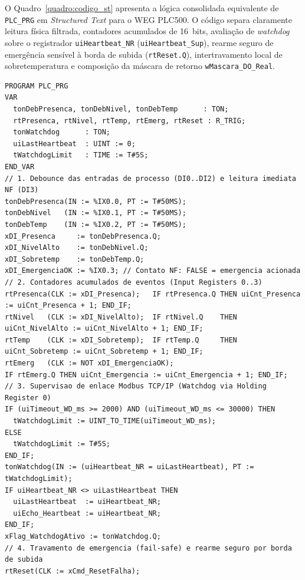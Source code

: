 O Quadro~\ref{quadro:codigo_st} apresenta a lógica consolidada equivalente de \texttt{PLC\_PRG} em \textit{Structured Text} para o WEG PLC500. O código separa claramente leitura física filtrada, contadores acumulados de 16~bits, avaliação de \textit{watchdog} sobre o registrador \texttt{uiHeartbeat\_NR} (\texttt{uiHeartbeat\_Sup}), rearme seguro de emergência sensível à borda de subida (\texttt{rtReset.Q}), intertravamento local de sobretemperatura e composição da máscara de retorno \texttt{wMascara\_DO\_Real}.

\begin{quadro}[htb]
  \centering
  \SingleSpacing
  \caption{Implementação em Structured Text (IEC 61131-3) do programa \texttt{PLC\_PRG} no WEG PLC500}
  \label{quadro:codigo_st}
  \begin{lstlisting}[language=IECST, basicstyle=\linespread{0.85}\selectfont\ttfamily\tiny\color{black}]
PROGRAM PLC_PRG
VAR
  tonDebPresenca, tonDebNivel, tonDebTemp      : TON;
  rtPresenca, rtNivel, rtTemp, rtEmerg, rtReset : R_TRIG;
  tonWatchdog      : TON;
  uiLastHeartbeat  : UINT := 0;
  tWatchdogLimit   : TIME := T#5S;
END_VAR
// 1. Debounce das entradas de processo (DI0..DI2) e leitura imediata NF (DI3)
tonDebPresenca(IN := %IX0.0, PT := T#50MS);
tonDebNivel   (IN := %IX0.1, PT := T#50MS);
tonDebTemp    (IN := %IX0.2, PT := T#50MS);
xDI_Presenca     := tonDebPresenca.Q;
xDI_NivelAlto    := tonDebNivel.Q;
xDI_Sobretemp    := tonDebTemp.Q;
xDI_EmergenciaOK := %IX0.3; // Contato NF: FALSE = emergencia acionada
// 2. Contadores acumulados de eventos (Input Registers 0..3)
rtPresenca(CLK := xDI_Presenca);   IF rtPresenca.Q THEN uiCnt_Presenca  := uiCnt_Presenca + 1; END_IF;
rtNivel   (CLK := xDI_NivelAlto);  IF rtNivel.Q    THEN uiCnt_NivelAlto := uiCnt_NivelAlto + 1; END_IF;
rtTemp    (CLK := xDI_Sobretemp);  IF rtTemp.Q     THEN uiCnt_Sobretemp := uiCnt_Sobretemp + 1; END_IF;
rtEmerg   (CLK := NOT xDI_EmergenciaOK);
IF rtEmerg.Q THEN uiCnt_Emergencia := uiCnt_Emergencia + 1; END_IF;
// 3. Supervisao de enlace Modbus TCP/IP (Watchdog via Holding Register 0)
IF (uiTimeout_WD_ms >= 2000) AND (uiTimeout_WD_ms <= 30000) THEN
  tWatchdogLimit := UINT_TO_TIME(uiTimeout_WD_ms);
ELSE
  tWatchdogLimit := T#5S;
END_IF;
tonWatchdog(IN := (uiHeartbeat_NR = uiLastHeartbeat), PT := tWatchdogLimit);
IF uiHeartbeat_NR <> uiLastHeartbeat THEN
  uiLastHeartbeat  := uiHeartbeat_NR;
  uiEcho_Heartbeat := uiHeartbeat_NR;
END_IF;
xFlag_WatchdogAtivo := tonWatchdog.Q;
// 4. Travamento de emergencia (fail-safe) e rearme seguro por borda de subida
rtReset(CLK := xCmd_ResetFalha);

\end{lstlisting}
\end{quadro}
